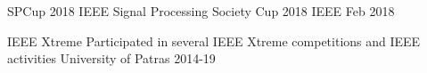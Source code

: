 
\begin{cvhonors}

  \cvhonor
    {SPCup 2018} %
    {IEEE Signal Processing Society Cup 2018} %
    {IEEE} %
    {Feb 2018} %

  \cvhonor
    {IEEE Xtreme} %
    {Participated in several IEEE Xtreme competitions and IEEE activities} %
    {University of Patras} %
    {2014-19} %

\end{cvhonors}